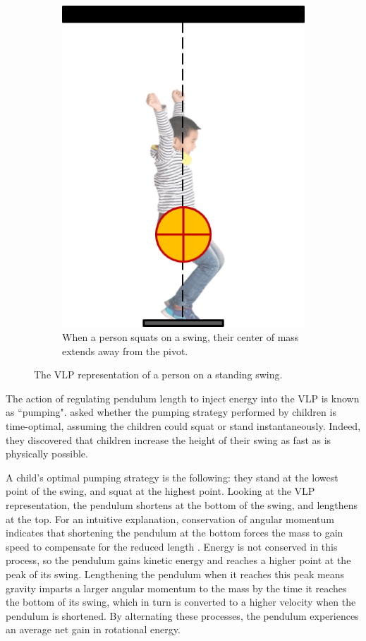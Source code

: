 \begin{figure}
\begin{subfigure}[t]{0.45\textwidth}
      \includegraphics[]{images/child_vlp_squatting.png}
      \caption{When a person squats on a swing, their center of mass extends
      away from the pivot.}
   \end{subfigure}
   \caption{The VLP representation of a person on a standing swing.}
   \label{fig:child-vlp}
\end{figure}

The action of regulating pendulum length to inject energy into the VLP is known as
``pumping". \citet{pumping_swing_standing_squatting} asked whether
the pumping strategy performed by children is time-optimal, assuming the
children could squat or stand instantaneously. 
Indeed, they discovered that children increase the height of their swing as fast
as is physically possible.

A child's optimal pumping strategy is the following: 
they stand at the lowest point of the swing, and squat at the highest point.
Looking at the VLP representation, the pendulum shortens at the bottom of the
swing, and lengthens at the top. 
For an intuitive explanation, conservation of angular momentum indicates that
shortening the pendulum at the bottom forces the mass to gain speed to
compensate for the reduced length \cite{how_to_pump_a_swing}.
Energy is not conserved in this process, so the pendulum gains kinetic energy
and reaches a higher point at the peak of its swing.
Lengthening the pendulum when it reaches this peak means gravity
imparts a larger angular momentum to the mass by the time it reaches the bottom
of its swing, which in turn is converted to a higher velocity when the
pendulum is shortened.
By alternating these processes, the pendulum experiences an average net gain in
rotational energy.

